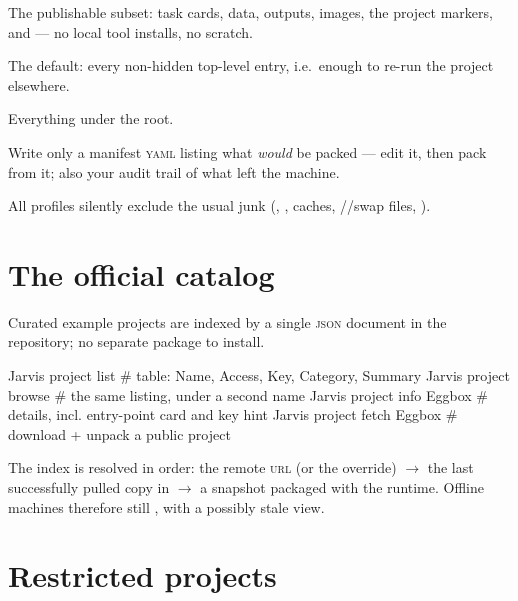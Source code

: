 \begin{keylist}
  \item[--share] The publishable subset: task cards, data, outputs, images, the
        project markers, and  --- no local tool installs, no scratch.
  \item[--repro] The default: every non-hidden top-level entry, i.e.\ enough to re-run
        the project elsewhere.
  \item[--full] Everything under the root.
  \item[--man] Write only a manifest \textsc{yaml} listing what \emph{would} be packed
        --- edit it, then pack from it; also your audit trail of what left the machine.
\end{keylist}

All profiles silently exclude the usual junk (, ,
caches, //swap files, ).

\section{The official catalog}
\label{sec:catalog}

Curated example projects are indexed by a single \textsc{json} document in the
 repository; no separate package to install.

\begin{terminal}
\begin{jcmd}
Jarvis project list          # table: Name, Access, Key, Category, Summary
Jarvis project browse        # the same listing, under a second name
Jarvis project info Eggbox   # details, incl. entry-point card and key hint
Jarvis project fetch Eggbox  # download + unpack a public project
\end{jcmd}
\end{terminal}

The index is resolved in order: the remote \textsc{url} (or the
 override) $\rightarrow$ the last
successfully pulled copy in  $\rightarrow$ a
snapshot packaged with the runtime. Offline machines therefore still , with a
possibly stale view.

\section{Restricted projects}
\label{sec:restricted}

